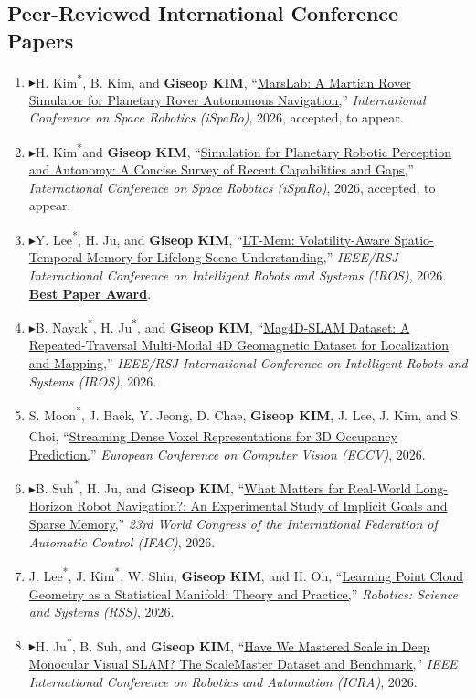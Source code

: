 \documentclass[10pt,a4paper]{article}
\newcommand{\pub}[2]{\Needspace{4\baselineskip}\item[#1.] #2}
\newcommand{\leadpub}{\textbf{\ensuremath{\blacktriangleright}}\hspace{0.25em}}
\newcommand{\me}{\textbf{Giseop KIM}}
\newcommand{\corr}{\textsuperscript{\dag}}
\newcommand{\first}{\textsuperscript{*}}
\begin{document}
\subsection{Peer-Reviewed International Conference Papers}
\begin{enumerate}
\pub{C19}{\leadpub H. Kim\first, B. Kim, and \me\corr, ``\href{https://arxiv.org/abs/2609.34702}{MarsLab: A Martian Rover Simulator for Planetary Rover Autonomous Navigation,}'' \textit{International Conference on Space Robotics (iSpaRo)}, 2026, accepted, to appear.}
\pub{C18}{\leadpub H. Kim\first and \me\corr, ``\href{https://arxiv.org/abs/2609.34743}{Simulation for Planetary Robotic Perception and Autonomy: A Concise Survey of Recent Capabilities and Gaps,}'' \textit{International Conference on Space Robotics (iSpaRo)}, 2026, accepted, to appear.}
\pub{C17}{\leadpub Y. Lee\first, H. Ju, and \me\corr, ``\href{https://arxiv.org/abs/2608.19059}{LT-Mem: Volatility-Aware Spatio-Temporal Memory for Lifelong Scene Understanding,}'' \textit{IEEE/RSJ International Conference on Intelligent Robots and Systems (IROS)}, 2026. \textbf{\href{https://team-aprl.github.io/gallery.html\#iros2026-best-paper-award}{Best Paper Award}}.}
\pub{C16}{\leadpub B. Nayak\first, H. Ju\first, and \me\corr, ``\href{https://arxiv.org/abs/2607.21986}{Mag4D-SLAM Dataset: A Repeated-Traversal Multi-Modal 4D Geomagnetic Dataset for Localization and Mapping,}'' \textit{IEEE/RSJ International Conference on Intelligent Robots and Systems (IROS)}, 2026.}
\pub{C15}{S. Moon\first, J. Baek, Y. Jeong, D. Chae, \me, J. Lee, J. Kim\corr, and S. Choi\corr, ``\href{https://arxiv.org/abs/2503.22087}{Streaming Dense Voxel Representations for 3D Occupancy Prediction,}'' \textit{European Conference on Computer Vision (ECCV)}, 2026.}
\pub{C14}{\leadpub B. Suh\first, H. Ju, and \me\corr, ``\href{https://team-aprl.github.io/assets/publications/bsuh-long-horizon-navigation-ifac-2026.pdf}{What Matters for Real-World Long-Horizon Robot Navigation?: An Experimental Study of Implicit Goals and Sparse Memory,}'' \textit{23rd World Congress of the International Federation of Automatic Control (IFAC)}, 2026.}
\pub{C13}{J. Lee\first, J. Kim\first, W. Shin, \me, and H. Oh\corr, ``\href{https://arxiv.org/abs/2605.10456}{Learning Point Cloud Geometry as a Statistical Manifold: Theory and Practice,}'' \textit{Robotics: Science and Systems (RSS)}, 2026.}
\pub{C12}{\leadpub H. Ju\first, B. Suh, and \me\corr, ``\href{https://arxiv.org/abs/2602.18174}{Have We Mastered Scale in Deep Monocular Visual SLAM? The ScaleMaster Dataset and Benchmark,}'' \textit{IEEE International Conference on Robotics and Automation (ICRA)}, 2026.}

\end{enumerate}
\end{document}
